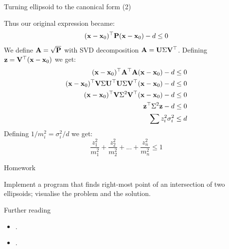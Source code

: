 \documentclass{beamer}
\begin{document}
\begin{frame}{Turning ellipsoid to the canonical form (2)}
	\begin{flushleft}
		
		Thus our original expression became:
		\begin{align}
			(\mathbf{x} - \mathbf{x}_0)^\top \mathbf{P}(\mathbf{x} - \mathbf{x}_0) - d \leq 0
		\end{align}
		We define $\mathbf{A} = \sqrt{\mathbf{P}}$ with SVD decomposition $\mathbf{A} = \mathbf{U} \Sigma \mathbf{V}^\top$. Defining $\mathbf{z} = \mathbf{V}^\top (\mathbf{x} - \mathbf{x}_0)$ we get:
	\begin{align}
		(\mathbf{x} - \mathbf{x}_0)^\top \mathbf{A}^\top\mathbf{A}(\mathbf{x} - \mathbf{x}_0) - d \leq 0 
		\\
		(\mathbf{x} - \mathbf{x}_0)^\top  \mathbf{V} \Sigma \mathbf{U}^\top  \mathbf{U} \Sigma \mathbf{V}^\top(\mathbf{x} - \mathbf{x}_0) - d \leq 0 
		\\
		(\mathbf{x} - \mathbf{x}_0)^\top  \mathbf{V} \Sigma^2 \mathbf{V}^\top(\mathbf{x} - \mathbf{x}_0) - d \leq 0
		\\
		\mathbf{z}^\top   \Sigma^2 \mathbf{z} - d \leq 0
		\\
		\sum z_i^2 \sigma_i^2  \leq d
	\end{align}
%
Defining $1/m_i^2 = \sigma_i^2 / d$ we get:
%
\begin{equation}
	\frac{z_1^2}{m_1^2} + \frac{z_2^2}{m_2^2} + ... + 
	\frac{z_n^2}{m_n^2} \leq 1
\end{equation}
		
	\end{flushleft}
\end{frame}





\begin{frame}{Homework}
\begin{flushleft}

Implement a program that finds right-most point of an intersection of two ellipsoids; visualise the problem and the solution.

\end{flushleft}
\end{frame}



\begin{frame}{Further reading}
	\begin{flushleft}
		
		\begin{itemize}
			\item {}.
			
			\item {}.
			
			
		\end{itemize}
		
		
	\end{flushleft}
\end{frame}


\myqrframe
\end{document}
